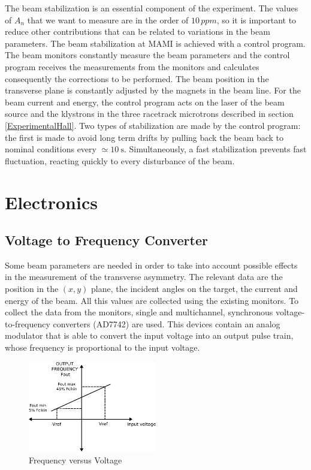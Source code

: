 The beam stabilization is an essential component of the experiment. The values of $A_{n}$ that we want to measure are in the order of  $10 \, ppm$, so it is important to reduce other contributions that can be related to variations in the beam parameters. The beam stabilization at MAMI is achieved with a control program. The beam monitors constantly measure the beam parameters and the control program receives the measurements from the monitors and calculates consequently the corrections to be performed. 
The beam position in the transverse plane is constantly adjusted by the magnets in the beam line. For the beam current and energy, the control program acts on the laser of the beam source and the klystrons in the three racetrack microtrons described in section \ref{ExperimentalHall}. Two types of stabilization are made by the control program: the first is made to avoid long term drifts by pulling back the beam back to nominal conditions every $\simeq \SI{10}{\second}$. Simultaneously, a fast stabilization prevents fast fluctuation, reacting quickly to every disturbance of the beam. 

\section{Electronics}
\subsection{Voltage to Frequency Converter} \label{VFCss} 

Some beam parameters are needed in order to take into account possible effects in the measurement of the transverse asymmetry. The relevant data are the position in the $(x,y)$ plane, the incident angles on the target, the current and energy of the beam. All this values are collected using the existing monitors. To collect the data from the monitors, single and multichannel, synchronous voltage-to-frequency converters (AD7742) are used. This devices contain an analog modulator that is able to convert the input voltage into an output pulse train, whose frequency is proportional to the input voltage. 

\begin{figure}[htb]
\centering
\includegraphics[width=0.5\textwidth]{ExperimentalSetup/Vfc.pdf}
\caption{Frequency versus Voltage}
\label{fig:VoltageToFrequency}
\vspace{10pt}
\end{figure}

